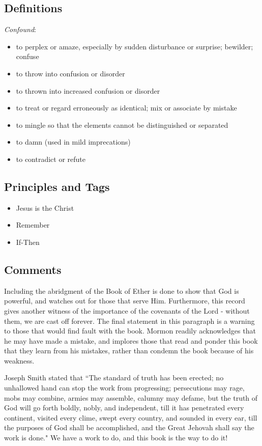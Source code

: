 \documentclass[12pt]{report}
\begin{document}
\subsection{Definitions\label{titlePage:DFN3}}
\emph{Confound}: \begin{itemize}
\item to perplex or amaze, especially by sudden disturbance or surprise; bewilder; confuse
\item to throw into confusion or disorder
\item to thrown into increased confusion or disorder
\item to treat or regard erroneously as identical; mix or associate by mistake
\item to mingle so that the elements cannot be distinguished or separated
\item to damn (used in mild imprecations)
\item to contradict or refute
\end{itemize}
\subsection{Principles and Tags\label{titlePage:principles3}}
\begin{itemize}
\item {}Jesus is the Christ
\item {}Remember
\item {}If-Then
\end{itemize}

\subsection{Comments\label{titlePage:comments3}}
Including the abridgment of the Book of Ether is done to show that God is powerful, and watches out for those that serve Him.  Furthermore, this record gives another witness of the importance of the covenants of the Lord - without them, we are cast off forever.  The final statement in this paragraph is a warning to those that would find fault with the book.  Mormon readily acknowledges that he may have made a mistake, and implores those that read and ponder this book that they learn from his mistakes, rather than condemn the book because of his weakness.

Joseph Smith stated that ``The standard of truth has been erected; no unhallowed hand can stop the work from progressing; persecutions may rage, mobs may combine, armies may assemble, calumny may defame, but the truth of God will go forth boldly, nobly, and independent, till it has penetrated every continent, visited every clime, swept every country, and sounded in every ear, till the purposes of God shall be accomplished, and the Great Jehovah shall say the work is done."  We have a work to do, and this book is the way to do it!
\end{document}
